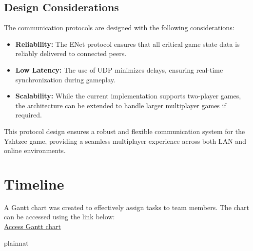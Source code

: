 \documentclass[12pt, titlepage]{article}
\begin{document}
\subsection{Design Considerations}

The communication protocols are designed with the following considerations:
\begin{itemize}
    \item \textbf{Reliability:} The ENet protocol ensures that all critical game state data is reliably delivered to connected peers.
    \item \textbf{Low Latency:} The use of UDP minimizes delays, ensuring real-time synchronization during gameplay.
    \item \textbf{Scalability:} While the current implementation supports two-player games, the architecture can be extended to handle larger multiplayer games if required.
\end{itemize}

This protocol design ensures a robust and flexible communication system for the Yahtzee game, providing a seamless multiplayer experience across both LAN and online environments.


\section{Timeline}

A Gantt chart was created to effectively assign tasks to team members. The chart can be accessed using the link below:\\

\href{https://mcmasteru365-my.sharepoint.com/:x:/r/personal/bhatth14_mcmaster_ca/Documents/Rev0%20Gnatt%20Chart.xlsx?d=w7c7c84af07004c328dc311a8721a5adb&csf=1&web=1&e=d8G3hJ}{Access Gantt chart}

 {plainnat}


\newpage{}
\end{document}
